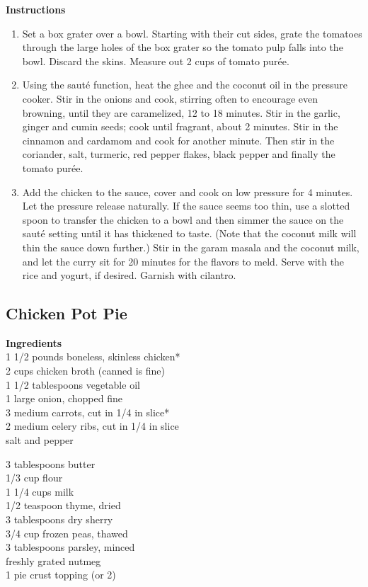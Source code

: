 \documentclass{article}
\numberwithin{figure}{section}
\numberwithin{equation}{section}
\begin{document}
{\bf Instructions}
\begin{enumerate}
\item Set a box grater over a bowl. Starting with their cut sides, grate the tomatoes through the large holes of the box grater so the tomato pulp falls into the bowl. Discard the skins. Measure out 2 cups of tomato purée.

\item Using the sauté function, heat the ghee and the coconut oil in the pressure cooker. Stir in the onions and cook, stirring often to encourage even browning, until they are caramelized, 12 to 18 minutes. Stir in the garlic, ginger and cumin seeds; cook until fragrant, about 2 minutes. Stir in the cinnamon and cardamom and cook for another minute. Then stir in the coriander, salt, turmeric, red pepper flakes, black pepper and finally the tomato purée.

\item Add the chicken to the sauce, cover and cook on low pressure for 4 minutes. Let the pressure release naturally. If the sauce seems too thin, use a slotted spoon to transfer the chicken to a bowl and then simmer the sauce on the sauté setting until it has thickened to taste. (Note that the coconut milk will thin the sauce down further.) Stir in the garam masala and the coconut milk, and let the curry sit for 20 minutes for the flavors to meld. Serve with the rice and yogurt, if desired. Garnish with cilantro.

\end{enumerate}

\pagebreak
\subsection{Chicken Pot Pie}
{\bf Ingredients}\\
1 1/2 pounds boneless, skinless chicken*\\
2 cups chicken broth (canned is fine)\\
1 1/2 tablespoons vegetable oil\\
1 large onion, chopped fine\\
3 medium carrots, cut in 1/4 in slice*\\
2 medium celery ribs, cut in 1/4 in slice\\
salt and pepper

3 tablespoons butter\\
1/3 cup flour\\
1 1/4 cups milk\\
1/2 teaspoon thyme, dried\\
3 tablespoons dry sherry\\
3/4 cup frozen peas, thawed\\
3 tablespoons parsley, minced\\
freshly grated nutmeg\\
1 pie crust topping (or 2)\\
\end{document}
